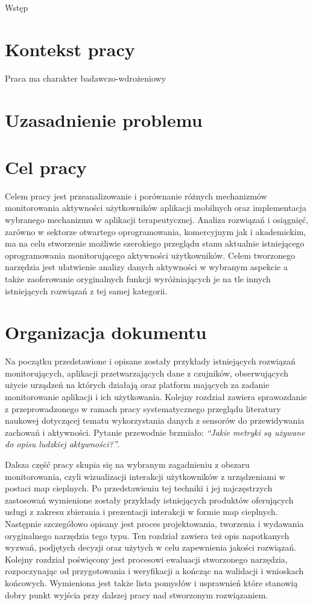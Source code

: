 \begin{chapter}{Wstęp}
	\newcommand{\chapterPath}{chapters/Introduction}

	\section{Kontekst pracy}
	Praca ma charakter badawczo-wdrożeniowy
	
	\section{Uzasadnienie problemu}
	
	\section{Cel pracy}
	Celem pracy jest przeanalizowanie i porównanie różnych mechanizmów monitorowania aktywności użytkowników aplikacji mobilnych oraz implementacja wybranego mechanizmu w aplikacji terapeutycznej. Analiza rozwiązań i osiągnięć, zarówno w sektorze otwartego oprogramowania, komercyjnym jak i akademickim, ma na celu stworzenie możliwie szerokiego przeglądu stanu aktualnie istniejącego oprogramowania monitorującego aktywności użytkowników. Celem tworzonego narzędzia jest ułatwienie analizy danych aktywności w wybranym aspekcie a także zaoferowanie oryginalnych funkcji wyróżniających je na tle innych istniejących rozwiązań z tej samej kategorii.
	
	\section{Organizacja dokumentu}
	Na początku przedstawione i opisane zostały przykłady istniejących rozwiązań monitorujących, aplikacji przetwarzających dane z czujników, obserwujących użycie urządzeń na których działają oraz platform mających za zadanie monitorowanie aplikacji i ich użytkowania. Kolejny rozdział zawiera sprawozdanie z przeprowadzonego w ramach pracy systematycznego przeglądu literatury naukowej dotyczącej tematu wykorzystania danych z sensorów do przewidywania zachowań i aktywności. Pytanie przewodnie brzmiało: {\it ``Jakie metryki są używane do opisu ludzkiej aktywności?''}. 
	
	Dalsza część pracy skupia się na wybranym zagadnieniu z obszaru monitorowania, czyli wizualizacji interakcji użytkowników z urządzeniami w postaci map cieplnych. Po przedstawieniu tej techniki i jej najczęstrzych zastosowań wymienione zostały przykłady istniejących produktów oferujących usługi z zakresu zbierania i prezentacji interakcji w formie map cieplnych. Następnie szczegółowo opisany jest proces projektowania, tworzenia i wydawania oryginalnego narzędzia tego typu. Ten rozdział zawiera też opis napotkanych wyzwań, podjętych decyzji oraz użytych w celu zapewnienia jakości rozwiązań. Kolejny rozdział poświęcony jest procesowi ewaluacji stworzonego narzędzia, rozpoczynając od przygotowania i weryfikacji a kończąc na walidacji i wnioskach końcowych. Wymieniona jest także lista pomysłów i usprawnień które stanowią dobry punkt wyjścia przy dalszej pracy nad stworzonym rozwiązaniem.
\end{chapter}
